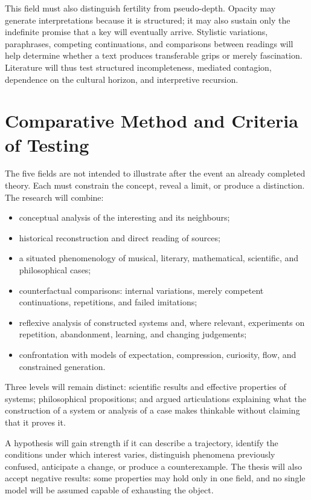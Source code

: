 \documentclass[11pt,a4paper]{article}
\begin{document}
This field must also distinguish fertility from pseudo-depth. Opacity may
generate interpretations because it is structured; it may also sustain only the
indefinite promise that a key will eventually arrive. Stylistic variations,
paraphrases, competing continuations, and comparisons between readings will
help determine whether a text produces transferable grips or merely
fascination. Literature will thus test structured incompleteness, mediated
contagion, dependence on the cultural horizon, and interpretive recursion.

\section{Comparative Method and Criteria of Testing}

The five fields are not intended to illustrate after the event an already
completed theory. Each must constrain the concept, reveal a limit, or produce a
distinction. The research will combine:

\begin{itemize}
  \item conceptual analysis of the interesting and its neighbours;
  \item historical reconstruction and direct reading of sources;
  \item a situated phenomenology of musical, literary, mathematical,
        scientific, and philosophical cases;
  \item counterfactual comparisons: internal variations, merely competent
        continuations, repetitions, and failed imitations;
  \item reflexive analysis of constructed systems and, where relevant,
        experiments on repetition, abandonment, learning, and changing
        judgements;
  \item confrontation with models of expectation, compression, curiosity,
        flow, and constrained generation.
\end{itemize}

Three levels will remain distinct: scientific results and effective properties
of systems; philosophical propositions; and argued articulations explaining
what the construction of a system or analysis of a case makes thinkable without
claiming that it proves it.

A hypothesis will gain strength if it can describe a trajectory, identify the
conditions under which interest varies, distinguish phenomena previously
confused, anticipate a change, or produce a counterexample. The thesis will also
accept negative results: some properties may hold only in one field, and no
single model will be assumed capable of exhausting the object.
\end{document}
